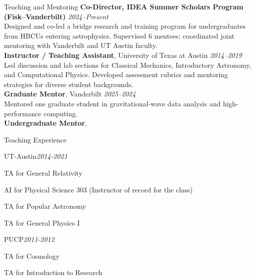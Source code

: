 \documentclass{resume}
\begin{document}
\begin{rSection}{Teaching and Mentoring}
{\bf Co-Director, IDEA Summer Scholars Program (Fisk–Vanderbilt)} \hfill {\em 2024–Present}\\
Designed and co-led a bridge research and training program for undergraduates from HBCUs entering astrophysics. Supervised 6 mentees; coordinated joint mentoring with Vanderbilt and UT Austin faculty.\\[4pt]
{\bf Instructor / Teaching Assistant}, University of Texas at Austin \hfill {\em 2014–2019}\\
Led discussion and lab sections for Classical Mechanics, Introductory Astronomy, and Computational Physics. Developed assessment rubrics and mentoring strategies for diverse student backgrounds.\\[4pt]
{\bf Graduate Mentor}, Vanderbilt {\em 2025–2024}\\
Mentored one graduate student in gravitational-wave data analysis and high-performance computing.\\
{\bf Undergraduate Mentor}, \\
\end{rSection}

\begin{rSection}{Teaching Experience}

\begin{rSubsection}{UT-Austin}{\em 2014-2021}{}{}
\item TA for General Relativity
\item AI for Physical Science 303  (Instructor of record for the class)
\item TA for Popular Astronomy
\item TA for General Physics I
\end{rSubsection}
\begin{rSubsection}{PUCP}{\em 2011-2012}{}{}
\item TA for Cosmology
\item TA for Introduction to Research
\end{rSubsection}

\end{rSection}
\end{document}
